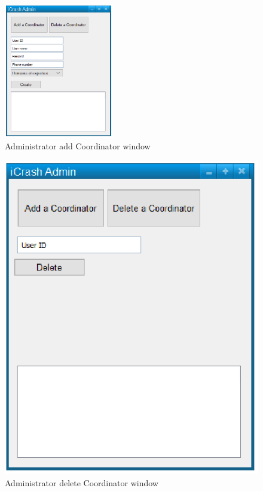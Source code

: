 \begin{figure}
  \centering
    \includegraphics[width=4.8cm]{images/mockups/feature1-login/AdminAddCoordinator.eps}
  \caption{Administrator add Coordinator window}
  \label{fig:AdminAddCoordinator}
\end{figure}


\begin{figure}
  \centering
    \includegraphics[scale=0.75]{images/mockups/other/AdminDeleteCoordinator.eps}
  \caption{Administrator delete Coordinator window}
  \label{fig:AdminDelete}
\end{figure}


